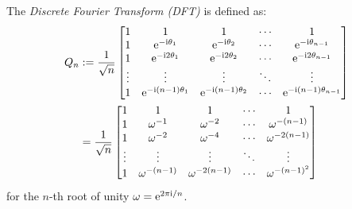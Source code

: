 \begin{definition}[DFT] The \emph{Discrete Fourier Transform (DFT)} is defined as:
\begin{align*}
Q_n &:= {1 \over \sqrt{n}} \begin{bmatrix} 1 & 1 & 1&  \ensuremath{\cdots} & 1 \\
                                    1 & {\rm e}^{-{\rm i} \ensuremath{\theta}_1} & {\rm e}^{-{\rm i} \ensuremath{\theta}_2} & \ensuremath{\cdots} & {\rm e}^{-{\rm i} \ensuremath{\theta}_{n-1}} \\
                                    1 & {\rm e}^{-{\rm i} 2 \ensuremath{\theta}_1} & {\rm e}^{-{\rm i} 2 \ensuremath{\theta}_2} & \ensuremath{\cdots} & {\rm e}^{-{\rm i} 2\ensuremath{\theta}_{n-1}} \\
                                    \ensuremath{\vdots} & \ensuremath{\vdots} & \ensuremath{\vdots} & \ensuremath{\ddots} & \ensuremath{\vdots} \\
                                    1 & {\rm e}^{-{\rm i} (n-1) \ensuremath{\theta}_1} & {\rm e}^{-{\rm i} (n-1) \ensuremath{\theta}_2} & \ensuremath{\cdots} & {\rm e}^{-{\rm i} (n-1) \ensuremath{\theta}_{n-1}}
\end{bmatrix} \\
&= {1 \over \sqrt{n}} \begin{bmatrix} 1 & 1 & 1&  \ensuremath{\cdots} & 1 \\
                                    1 & \ensuremath{\omega}^{-1} & \ensuremath{\omega}^{-2} & \ensuremath{\cdots} & \ensuremath{\omega}^{-(n-1)}\\
                                    1 & \ensuremath{\omega}^{-2} & \ensuremath{\omega}^{-4} & \ensuremath{\cdots} & \ensuremath{\omega}^{-2(n-1)}\\
                                    \ensuremath{\vdots} & \ensuremath{\vdots} & \ensuremath{\vdots} & \ensuremath{\ddots} & \ensuremath{\vdots} \\
                                    1 & \ensuremath{\omega}^{-(n-1)} & \ensuremath{\omega}^{-2(n-1)} & \ensuremath{\cdots} & \ensuremath{\omega}^{-(n-1)^2}
\end{bmatrix}
\end{align*}
for the $n$-th root of unity $\ensuremath{\omega} = {\rm e}^{2\ensuremath{\pi}{\rm i}/n}$.  \end{definition}

